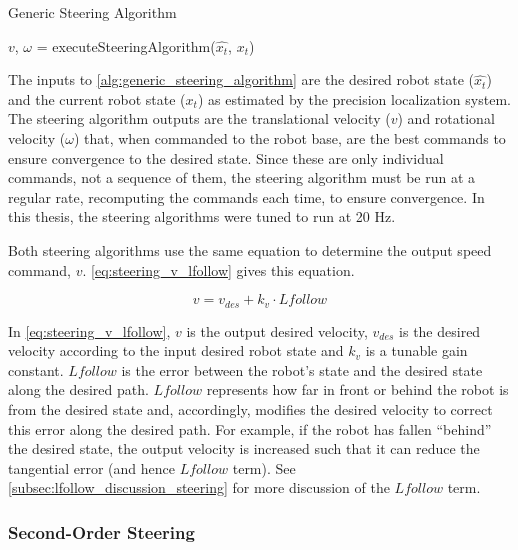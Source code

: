 \begin{algorithm}
\caption{Generic Steering Algorithm}
\label{alg:generic_steering_algorithm}
\DontPrintSemicolon


$v$, $\omega$ = executeSteeringAlgorithm($\hat{x_t}$, $x_t$)\;

\end{algorithm}

The inputs to \autoref{alg:generic_steering_algorithm} are the desired robot state ($\hat{x_t}$) and the current robot state ($x_t$) as estimated by the precision localization system. The steering algorithm outputs are the translational velocity ($v$) and rotational velocity ($\omega$) that, when commanded to the robot base, are the best commands to ensure convergence to the desired state. Since these are only individual commands, not a sequence of them, the steering algorithm must be run at a regular rate, recomputing the commands each time, to ensure convergence. In this thesis, the steering algorithms were tuned to run at 20 Hz.

Both steering algorithms use the same equation to determine the output speed command, $v$. \eqref{eq:steering_v_lfollow} gives this equation.

\begin{equation}
v = v_{des} + k_v \cdot Lfollow
\label{eq:steering_v_lfollow}
\end{equation}

In \eqref{eq:steering_v_lfollow}, $v$ is the output desired velocity, $v_{des}$ is the desired velocity according to the input desired robot state and $k_v$ is a tunable gain constant. $Lfollow$ is the error between the robot's state and the desired state along the desired path. $Lfollow$ represents how far in front or behind the robot is from the desired state and, accordingly, modifies the desired velocity to correct this error along the desired path. For example, if the robot has fallen ``behind'' the desired state, the output velocity is increased such that it can reduce the tangential error (and hence $Lfollow$ term). See \autoref{subsec:lfollow_discussion_steering}  for more discussion of the $Lfollow$ term.

\subsubsection{Second-Order Steering}\label{subsubsec:second_order_steering}

